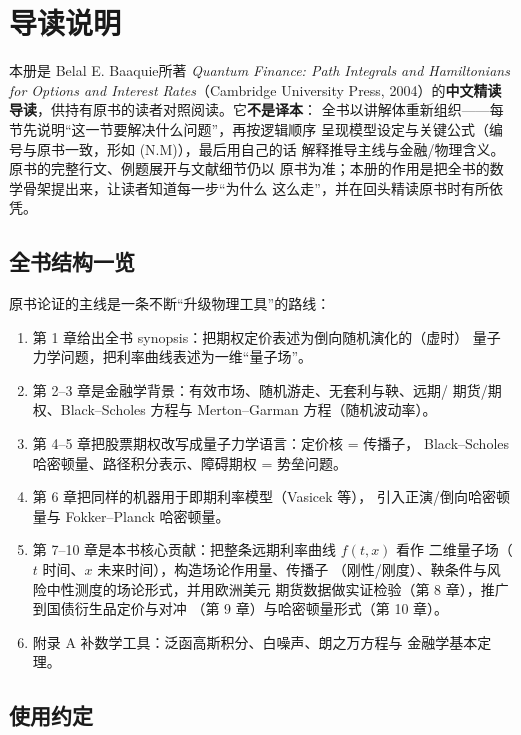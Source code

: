 \chapter*{导读说明}

本册是 Belal E. Baaquie所著 \emph{Quantum Finance: Path Integrals and
Hamiltonians for Options and Interest Rates}（Cambridge University Press,
2004）的\textbf{中文精读导读}，供持有原书的读者对照阅读。它\textbf{不是译本}：
全书以讲解体重新组织——每节先说明“这一节要解决什么问题”，再按逻辑顺序
呈现模型设定与关键公式（编号与原书一致，形如 (N.M)），最后用自己的话
解释推导主线与金融/物理含义。原书的完整行文、例题展开与文献细节仍以
原书为准；本册的作用是把全书的数学骨架提出来，让读者知道每一步“为什么
这么走”，并在回头精读原书时有所依凭。

\section*{全书结构一览}

原书论证的主线是一条不断“升级物理工具”的路线：

\begin{enumerate}[itemsep=0.2em]
\item 第 1 章给出全书 synopsis：把期权定价表述为倒向随机演化的（虚时）
      量子力学问题，把利率曲线表述为一维“量子场”。
\item 第 2--3 章是金融学背景：有效市场、随机游走、无套利与鞅、远期/
      期货/期权、Black--Scholes 方程与 Merton--Garman 方程（随机波动率）。
\item 第 4--5 章把股票期权改写成量子力学语言：定价核 = 传播子，
      Black--Scholes 哈密顿量、路径积分表示、障碍期权 = 势垒问题。
\item 第 6 章把同样的机器用于即期利率模型（Vasicek 等），
      引入正演/倒向哈密顿量与 Fokker--Planck 哈密顿量。
\item 第 7--10 章是本书核心贡献：把整条远期利率曲线 $f(t,x)$ 看作
      二维量子场（$t$ 时间、$x$ 未来时间），构造场论作用量、传播子
      （刚性/刚度）、鞅条件与风险中性测度的场论形式，并用欧洲美元
      期货数据做实证检验（第 8 章），推广到国债衍生品定价与对冲
      （第 9 章）与哈密顿量形式（第 10 章）。
\item 附录 A 补数学工具：泛函高斯积分、白噪声、朗之万方程与
      金融学基本定理。
\end{enumerate}

\section*{使用约定}


